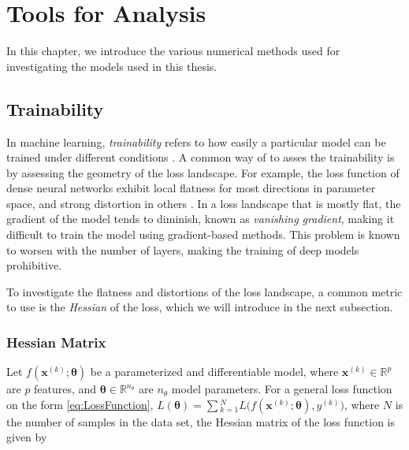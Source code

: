 \chapter{Tools for Analysis}\label{chap:TfA}
In this chapter, we introduce the various numerical methods used for investigating the models used in this thesis. 


\section{Trainability}\label{sec:Trainability}
In machine learning, \emph{trainability} refers to how easily a particular model can be trained under different conditions \cite{abbas2020power}. A common way of to asses the trainability is by assessing the geometry of the loss landscape. For example, the loss function of dense neural networks exhibit local flatness for most directions in parameter space, and strong distortion in others \cite{karakida2019universal}. In a loss landscape that is mostly flat, the gradient of the model tends to diminish, known as \emph{vanishing gradient}, making it difficult to train the model using gradient-based methods. This problem is known to worsen with the number of layers, making the training of deep models prohibitive.

To investigate the flatness and distortions of the loss landscape, a common metric to use is the \emph{Hessian} of the loss, which we will introduce in the next subsection. 
\subsection{Hessian Matrix}\label{sec:HessianMatrix}
Let $f(\boldsymbol{x}^{(k)}; \boldsymbol{\theta})$ be a parameterized and differentiable model, where $\boldsymbol{x}^{(k)} \in \mathbb{R}^p$ are $p$ features, and $\boldsymbol{\theta} \in \mathbb{R}^{n_\theta}$ are $n_{\theta}$ model parameters. For a general loss function on the form \autoref{eq:LossFunction}, $L(\boldsymbol{\theta}) = \sum{_{k=1}^{N}L(f(\boldsymbol{x}^{(k)};\boldsymbol{\theta}), y^{(k)}})$, where $N$ is the number of samples in the data set, the Hessian matrix of the loss function is given by

